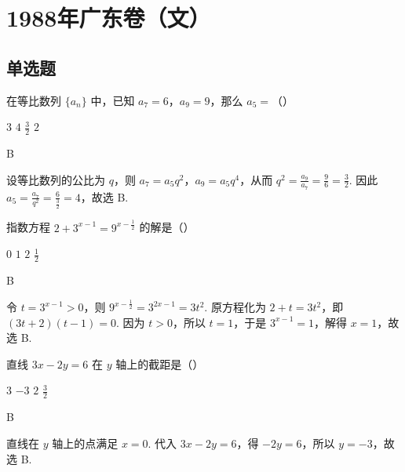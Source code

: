 \chapter{1988年广东卷（文）}

\section{单选题}

\begin{problem}
在等比数列 \(\{a_n\}\) 中，已知 \(a_7 = 6\)，\(a_9 = 9\)，那么 \(a_5 =\)（\quad）

\choices
    {\(3\)}
    {\(4\)}
    {\(\frac{3}{2}\)}
    {\(2\)}
\end{problem}

\begin{answer}
B
\end{answer}

\begin{solution}
设等比数列的公比为 \(q\)，则 \(a_7=a_5q^2\)，\(a_9=a_5q^4\)，从而 \(q^2=\frac{a_9}{a_7}=\frac{9}{6}=\frac{3}{2}\). 因此 \(a_5=\frac{a_7}{q^2}=\frac{6}{\frac{3}{2}}=4\)，故选 B.
\end{solution}

\begin{problem}
指数方程 \(2 + 3^{x - 1} = 9^{x - \frac{1}{2}}\) 的解是（\quad）

\choices
    {\(0\)}
    {\(1\)}
    {\(2\)}
    {\(\frac{1}{2}\)}
\end{problem}

\begin{answer}
B
\end{answer}

\begin{solution}
令 \(t=3^{x-1}>0\)，则 \(9^{x-\frac{1}{2}}=3^{2x-1}=3t^2\). 原方程化为 \(2+t=3t^2\)，即 \((3t+2)(t-1)=0\). 因为 \(t>0\)，所以 \(t=1\)，于是 \(3^{x-1}=1\)，解得 \(x=1\)，故选 B.
\end{solution}

\begin{problem}
直线 \(3x - 2y = 6\) 在 \(y\) 轴上的截距是（\quad）

\choices
    {\(3\)}
    {\(-3\)}
    {\(2\)}
    {\(\frac{3}{2}\)}
\end{problem}

\begin{answer}
B
\end{answer}

\begin{solution}
直线在 \(y\) 轴上的点满足 \(x=0\). 代入 \(3x-2y=6\)，得 \(-2y=6\)，所以 \(y=-3\)，故选 B.
\end{solution}

